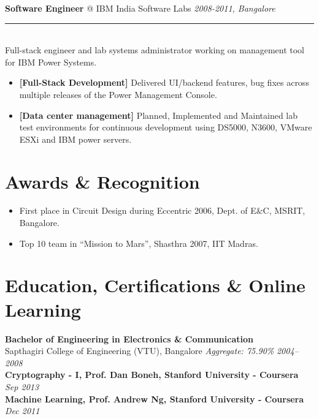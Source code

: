 \documentclass[11pt]{article}
\makeatletter
\newcommand{\roleheader}[3]{%
  {\large\sffamily\textbf{#1} @ #2} \hfill \textit{#3}\\[-0.3em]
  \color{myblue}\rule{\linewidth}{1pt}\\[0.5em]\color{bodytext}
}
\newenvironment{experiencebullets}{%
  \begin{itemize}[leftmargin=1.25em, itemsep=-0.25em]
    \renewcommand{\labelitemi}{\textbullet}
}{%
  \end{itemize}
}
\newenvironment{experience}[4]{%
  \roleheader{#1}{#2}{#3}%
  #4\vspace{0.5em}%
}{%
  \vspace{1em}
}
\makeatother
\begin{document}
\begin{experience}{Software Engineer}{IBM India Software Labs}{2008-2011, Bangalore}{Full-stack engineer and lab systems administrator working on management tool for IBM Power Systems.}
  \begin{experiencebullets}
    \item \textbf{[Full-Stack Development]} Delivered UI/backend features, bug fixes across multiple releases of the Power Management Console.
    \item \textbf{[Data center management]} Planned, Implemented and Maintained lab test environments for continuous development using DS5000, N3600, VMware ESXi and IBM power servers.
  \end{experiencebullets}
\end{experience}

\section*{Awards \& Recognition}
\begin{itemize}[leftmargin=*, itemsep=0em]
  \item First place in Circuit Design during Eccentric 2006, Dept. of E\&C, MSRIT, Bangalore.
  \item Top 10 team in “Mission to Mars”, Shasthra 2007, IIT Madras.
\end{itemize}


\section*{Education, Certifications \& Online Learning}

\textbf{Bachelor of Engineering in Electronics \& Communication} \\
Sapthagiri College of Engineering (VTU), Bangalore \hfill \textit{Aggregate: 75.90\%} \textit{2004–2008}  \\

\vspace{0.5em}
\textbf{Cryptography - I, Prof. Dan Boneh, Stanford University - Coursera} \hfill \textit{Sep 2013} \\

\textbf{Machine Learning, Prof. Andrew Ng, Stanford University - Coursera} \hfill \textit{Dec 2011} \\
\end{document}
